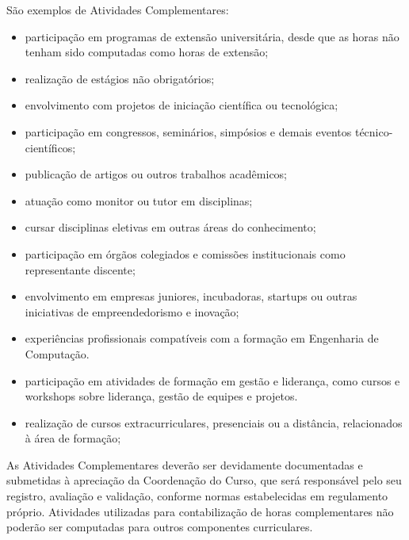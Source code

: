 \documentclass[oneside,envcountsame,envcountchap,openany]{svmono}
\begin{document}
São exemplos de Atividades Complementares:
\begin{itemize}
  \item participação em programas de extensão universitária, desde que as horas não tenham sido computadas como horas de extensão;
  \item realização de estágios não obrigatórios;
  \item envolvimento com projetos de iniciação científica ou tecnológica;
  \item participação em congressos, seminários, simpósios e demais eventos técnico-científicos;
  \item publicação de artigos ou outros trabalhos acadêmicos;
  \item atuação como monitor ou tutor em disciplinas;
  \item cursar disciplinas eletivas em outras áreas do conhecimento;
  \item participação em órgãos colegiados e comissões institucionais como representante discente;
  \item envolvimento em empresas juniores, incubadoras, startups ou outras iniciativas de empreendedorismo e inovação;
  \item experiências profissionais compatíveis com a formação em Engenharia de Computação.
  \item participação em atividades de formação em gestão e liderança, como cursos e workshops sobre liderança, gestão de equipes e projetos.
  \item realização de cursos extracurriculares, presenciais ou a distância, relacionados à área de formação;
\end{itemize}

As Atividades Complementares deverão ser devidamente documentadas e submetidas à apreciação da Coordenação do Curso, que será responsável pelo seu registro, avaliação e validação, conforme normas estabelecidas em regulamento próprio. Atividades utilizadas para contabilização de horas complementares não poderão ser computadas para outros componentes curriculares.
\end{document}
